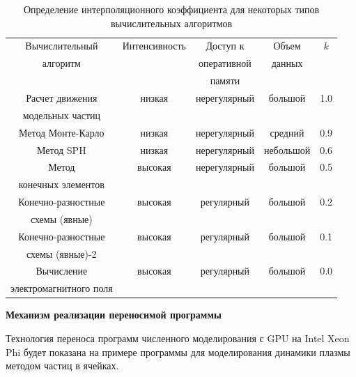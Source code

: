 \begin{table}[ht]
	\begin{center}
		\caption{Определение интерполяционного коэффициента для некоторых типов вычислительных алгоритмов}
		\begin{tabular}{|c|c|c|c|c|}
			\hline
			Вычислительный    & Интенсивность &  Доступ к           & Объем  & $k$  \\ 
			алгоритм          &               &  оперативной  & данных &  \\
			&               &  памяти       &        &  \\ \hline
			Расчет движения   &  низкая       & нерегулярный        & большой & 1.0 \\ 
			модельных частиц  &               &                     &          & \\\hline
			Метод Монте-Карло &  низкая       & нерегулярный        & средний & 0.9 \\ \hline
			Метод SPH         &  низкая       & нерегулярный        & небольшой & 0.6 \\ \hline	Метод             &  высокая      & нерегулярный        & большой & 0.5  \\
			конечных элементов &          &              &         & \\ \hline
			Конечно-разностные &  высокая  & регулярный & большой & 0.2 \\ 		
			схемы (явные)      &           &            &         &     \\\hline
			Конечно-разностные &  высокая  & регулярный & большой & 0.1 \\ 		
			схемы (явные)-2    &           &            &         &     \\\hline
			Вычисление         &  высокая  & регулярный & большой & 0.0 \\ 		
			электромагнитного поля      &           &            &         &     \\\hline
			
			
		\end{tabular} 
		\label{tab-interp-koef}              
	\end{center}
\end{table}


\textbf{Механизм реализации переносимой программы}

Технология переноса программ численного моделирования с GPU на Intel Xeon Phi
будет показана на примере программы для моделирования динамики плазмы методом частиц в ячейках.

